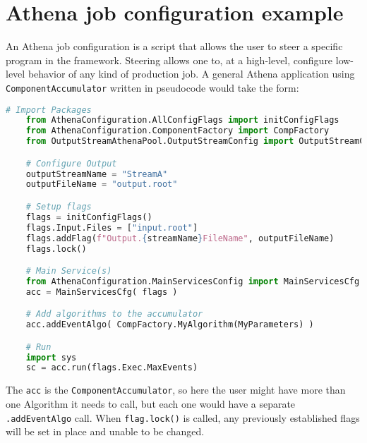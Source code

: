 \section{Athena job configuration example}

An Athena job configuration is a script that allows the user to steer a specific program in the framework.
Steering allows one to, at a high-level, configure low-level behavior of any kind of production job. 
A general Athena application using \verb|ComponentAccumulator| written in pseudocode would take the form: 
\begin{lstlisting}[language=Python]
    # Import Packages
    from AthenaConfiguration.AllConfigFlags import initConfigFlags
    from AthenaConfiguration.ComponentFactory import CompFactory
    from OutputStreamAthenaPool.OutputStreamConfig import OutputStreamCfg, outputStreamName

    # Configure Output
    outputStreamName = "StreamA"
    outputFileName = "output.root"

    # Setup flags
    flags = initConfigFlags()
    flags.Input.Files = ["input.root"]
    flags.addFlag(f"Output.{streamName}FileName", outputFileName)
    flags.lock()

    # Main Service(s)
    from AthenaConfiguration.MainServicesConfig import MainServicesCfg
    acc = MainServicesCfg( flags )

    # Add algorithms to the accumulator
    acc.addEventAlgo( CompFactory.MyAlgorithm(MyParameters) )

    # Run
    import sys
    sc = acc.run(flags.Exec.MaxEvents)
\end{lstlisting}

The \verb|acc| is the \verb|ComponentAccumulator|, so here the user might have more than one Algorithm it needs to call, but each one would have a separate \verb|.addEventAlgo| call. 
When \verb|flag.lock()| is called, any previously established flags will be set in place and unable to be changed. 
